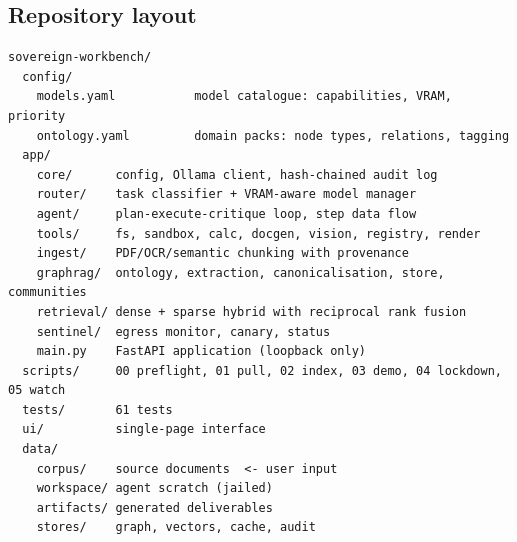 \subsection{Repository layout}

\begin{lstlisting}
sovereign-workbench/
  config/
    models.yaml           model catalogue: capabilities, VRAM, priority
    ontology.yaml         domain packs: node types, relations, tagging
  app/
    core/      config, Ollama client, hash-chained audit log
    router/    task classifier + VRAM-aware model manager
    agent/     plan-execute-critique loop, step data flow
    tools/     fs, sandbox, calc, docgen, vision, registry, render
    ingest/    PDF/OCR/semantic chunking with provenance
    graphrag/  ontology, extraction, canonicalisation, store, communities
    retrieval/ dense + sparse hybrid with reciprocal rank fusion
    sentinel/  egress monitor, canary, status
    main.py    FastAPI application (loopback only)
  scripts/     00 preflight, 01 pull, 02 index, 03 demo, 04 lockdown, 05 watch
  tests/       61 tests
  ui/          single-page interface
  data/
    corpus/    source documents  <- user input
    workspace/ agent scratch (jailed)
    artifacts/ generated deliverables
    stores/    graph, vectors, cache, audit
\end{lstlisting}

